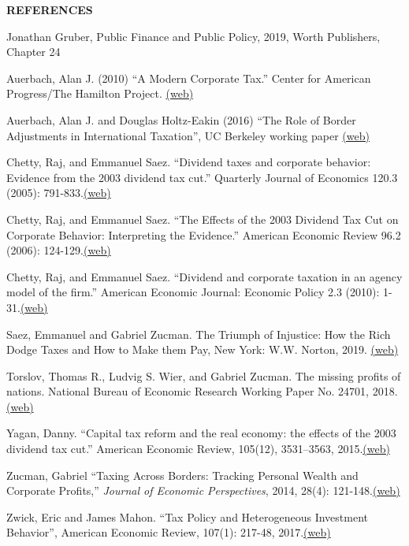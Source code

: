 \documentclass[landscape]{slides}
\begin{document}
\begin{slide}
\begin{center}
{\bf REFERENCES}
\end{center}
{\small

Jonathan Gruber, Public Finance and Public Policy, 2019, Worth Publishers, Chapter 24

Auerbach, Alan J. (2010) ``A Modern Corporate Tax.'' Center for American Progress/The Hamilton
Project. \href{http://elsa.berkeley.edu/~saez/course131/auerbach2010corptax.pdf}{(web)}

Auerbach, Alan J. and Douglas Holtz-Eakin (2016) ``The Role of Border Adjustments in International Taxation'', UC Berkeley working paper  \href{http://elsa.berkeley.edu/~saez/course131/auerbach-hotzeakin2016.pdf}{(web)}

Chetty, Raj, and Emmanuel Saez. ``Dividend taxes and corporate behavior: Evidence from the 2003 dividend tax cut.'' Quarterly Journal of Economics 120.3 (2005): 791-833.\href{http://elsa.berkeley.edu/~saez/chetty-saezQJE05dividends.pdf}{(web)}

Chetty, Raj, and Emmanuel Saez. ``The Effects of the 2003 Dividend Tax Cut on Corporate Behavior: Interpreting the Evidence.'' American Economic Review 96.2 (2006): 124-129.\href{http://elsa.berkeley.edu/~saez/chetty-saezAEA06.pdf}{(web)}

Chetty, Raj, and Emmanuel Saez. ``Dividend and corporate taxation in an agency model of the firm.'' American Economic Journal: Economic Policy 2.3 (2010): 1-31.\href{http://emlab.berkeley.edu/users/saez/chetty-saezAEJ10divtaxtheory.pdf}{(web)}


Saez, Emmanuel and Gabriel Zucman. The Triumph of Injustice: How the Rich Dodge Taxes and How to Make them Pay, New York: W.W. Norton, 2019. 
\href{http://www.taxjusticenow.org} {(web)}

Torslov, Thomas R., Ludvig S. Wier, and Gabriel Zucman. The missing profits of nations. National Bureau of Economic Research Working Paper
No. 24701, 2018. \href{https://www.nber.org/papers/w24701.pdf} {(web)}

Yagan, Danny. ``Capital tax reform and the real economy: the effects of the 2003 dividend tax cut.'' American Economic Review, 105(12), 3531--3563, 2015.\href{http://elsa.berkeley.edu/~saez/course131/yaganAER15.pdf}{(web)}

Zucman, Gabriel ``Taxing Across Borders: Tracking Personal Wealth and Corporate Profits,'' \emph{Journal of Economic Perspectives}, 2014, 28(4): 121-148.\href{http://elsa.berkeley.edu/~saez/course131/Zucman2014JEP.pdf}{(web)}

Zwick, Eric and James Mahon. ``Tax Policy and Heterogeneous Investment Behavior'', American Economic Review, 107(1): 217-48, 2017.\href{http://elsa.berkeley.edu/~saez/course131/zwick-mahonAER17.pdf}{(web)}


}
\end{slide}
\end{document}
